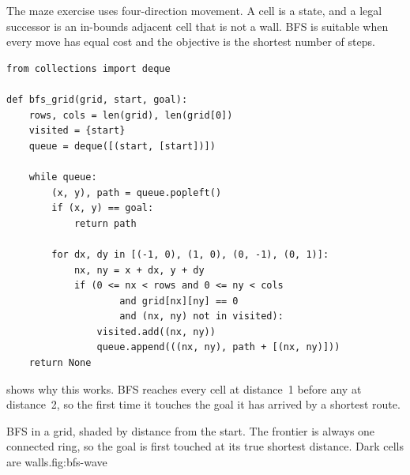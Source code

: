 The maze exercise uses four-direction movement. A cell is a state, and a legal successor is an in-bounds adjacent cell that is not a wall. BFS is suitable when every move has equal cost and the objective is the shortest number of steps.

\begin{lstlisting}[style=mlpython]
from collections import deque

def bfs_grid(grid, start, goal):
    rows, cols = len(grid), len(grid[0])
    visited = {start}
    queue = deque([(start, [start])])

    while queue:
        (x, y), path = queue.popleft()
        if (x, y) == goal:
            return path

        for dx, dy in [(-1, 0), (1, 0), (0, -1), (0, 1)]:
            nx, ny = x + dx, y + dy
            if (0 <= nx < rows and 0 <= ny < cols
                    and grid[nx][ny] == 0
                    and (nx, ny) not in visited):
                visited.add((nx, ny))
                queue.append(((nx, ny), path + [(nx, ny)]))
    return None
\end{lstlisting}

 shows why this works. BFS reaches every cell at distance~1 before any
at distance~2, so the first time it touches the goal it has arrived by a shortest route.

\begin{aifig}{BFS in a grid, shaded by distance from the start. The frontier is always one connected ring, so the goal is first touched at its true shortest distance. Dark cells are walls.}{fig:bfs-wave}
\end{aifig}

